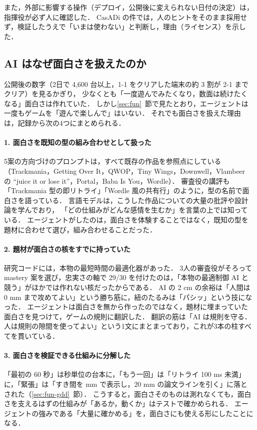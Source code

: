 \documentclass[a4paper,10pt]{ltjsarticle}
\newcommand{\secref}[1]{\ref{#1}~節}
\begin{document}
また，外部に影響する操作（デプロイ，公開後に変えられない日付の決定）は，指揮役が必ず人に確認した．
CasADi の件では，人のヒントをそのまま採用せず，検証したうえで「いまは使わない」と判断し，理由（ライセンス）を示した．

\subsection{AI はなぜ面白さを扱えたのか}
\label{sec:whyfun}
公開後の数字（2日で 4,600 台以上，1-1 をクリアした端末の約 3 割が 2-1 までクリア）を見るかぎり，
少なくとも「一度遊んでみたくなり，数面は続けたくなる」面白さは作れていた．
しかし\secref{sec:fun}で見たとおり，エージェントは一度もゲームを「遊んで楽しんで」はいない．
それでも面白さを扱えた理由は，記録から次の4つにまとめられる．

\paragraph{1. 面白さを既知の型の組み合わせとして扱った}
5案の方向づけのプロンプトは，すべて既存の作品を参照点にしている
（Trackmania，Getting Over It，QWOP，Tiny Wings，Downwell，Vlambeer の ``juice it or lose it''，Portal，Baba Is You，Wordle）．
審査役の講評も「Trackmania 型の即リトライ」「Wordle 風の共有行」のように，型の名前で面白さを語っている．
言語モデルは，こうした作品についての大量の批評や設計論を学んでおり，
「どの仕組みがどんな感情を生むか」を言葉の上では知っている．
エージェントがしたのは，面白さを体験することではなく，既知の型を題材に合わせて選び，組み合わせることだった．

\paragraph{2. 題材が面白さの核をすでに持っていた}
研究コードには，本物の最短時間の最適化器があった．
3人の審査役がそろって mastery 案を選び，忠実さの軸で 29/30 を付けたのは，「本物の最適制御 AI と競う」がほかでは作れない核だったからである．
AI の 2 cm の余裕は「人間は 0 mm まで攻めてよい」という勝ち筋に，紐のたるみは「パシッ」という技になった．
エージェントは面白さを無から作ったのではなく，題材に埋まっていた面白さを見つけて，ゲームの規則に翻訳した．
翻訳の筋は「AI は規則を守る．人は規則の隙間を使ってよい」という1文にまとまっており，これが3本の柱すべてを貫いている．

\paragraph{3. 面白さを検証できる仕組みに分解した}
「最初の 60 秒」は秒単位の台本に，「もう一回」は「リトライ 100 ms 未満」に，「緊張」は「すき間を mm で表示し，20 mm の論文ラインを引く」に落とされた（\secref{sec:fun-gdd}）．
こうすると，面白さそのものは測れなくても，面白さを支えるはずの仕組みが「あるか，動くか」はテストで確かめられる．
エージェントの強みである「大量に確かめる」を，面白さにも使える形にしたことになる．
\end{document}
